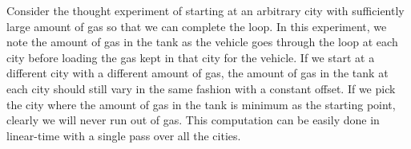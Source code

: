Consider the thought experiment of starting at an arbitrary city with sufficiently large amount
of gas so that we can complete the loop. In this experiment, we note the amount
of gas in the tank as the vehicle goes through the loop at each
city before loading the gas kept in that city for the vehicle. If
we start at a different city with a different amount of gas, the amount
of gas in the tank at each city should still vary in the same fashion
with a constant offset. If we pick the city where the amount of gas in
the tank is minimum as the starting point, clearly we will never run out
of gas. This computation can be easily done in linear-time with a
single pass over all the cities.


\begin{comment}
Let the cities be numbered $0,1,\ldots,n-1$, and let it take $d_i$
gas to drive from city $i$ to $i+1 \bmod{n}$. Suppose there is $g_i$
gas available at city $i$.  

We are given that $G = \sum_{i=0}^{n-1} g_i = D = \sum_{i=0}^{n-1}  d_i$.

Suppose for the sake of contradiction---there is no city from 
which we can start with an empty tank and drive a complete
cycle.

Suppose we start at $0$, and the furthest we can get to without running
out of gas is $F_0$ ($F_0$ may be $0$ itself). 
This means that the sum of the $g_i$'s from $0$ to $F_0$ (inclusive)
is strictly less than the sum of the $d_i$'s from $0$ to $F_0$.

Now consider starting at $F_0 + 1$, say the furthest we can get
to is $F_1$.  In this way, we get a series of paths
$\langle 0,\ldots, F_0\rangle$, $\langle F_0 + 1,\ldots, F_1\rangle$,
etc. 

For a path $\langle A,\ldots, B\rangle$, we will refer to $A$ as 
being the start, and $B$ as being the end.

Since the number of cities is finite, at some point we must have
the end $e$ of one path being the start $s$ of another path.  If we sum
up the $g_i$'s for all the cities occurring on the paths starting at $s$
until we get to $e$, we will get $k \cdot G$, where $k > 0$ (since we may loop
around multiple times).  Similarly, the sum of the $d_i$'s will be $k \cdot D$.

But, by construction, for each path, the sum of the $g_i$'s is less than the
sum of the $g_i$'s, which leads to a contradiction.

Here's a much simpler solution: there must be some city $i$ with enough gas $g_i$ to drive to
the next city. Logically, the gas from city $i+1 \bmod{n}$ can be added to the gas at
city $i$, and city $i+1 \bmod{n}$ can be removed from consideration. The remaining
cities, together with $i$ (which now has gas $g_i + g_{i+1 \bmod{n}}$) satisfy
the conditions of the problem, so we can inductively continue till we've got just one city with
enough gas to complete the circuit.
\end{comment}

